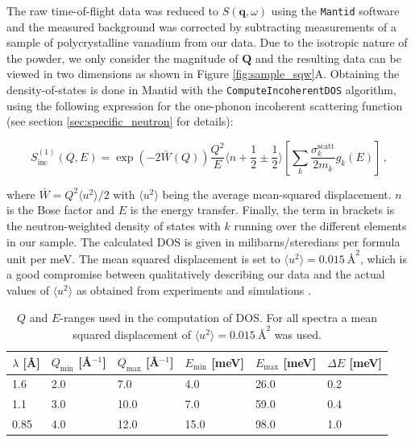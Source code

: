 The raw time-of-flight data was reduced to $S(\bm{q},\omega)$ using the \texttt{Mantid} \cite{Arnold2014} software and the measured background was corrected by subtracting measurements of a sample of polycrystalline vanadium from our data. Due to the isotropic nature of the powder, we only consider the magnitude of $\bm{Q}$ and the resulting data can be viewed in two dimensions as shown in Figure \ref{fig:sample_sqw}A. Obtaining the density-of-states is done in Mantid with the \texttt{ComputeIncoherentDOS} \cite{mantid_dos} algorithm, using the following expression for the one-phonon incoherent scattering function (see section \ref{sec:specific_neutron} for details):

 \[ S^{(1)}_{\mathrm{inc}}(Q,E) = \exp\left(-2\bar{W}(Q)\right) \frac{Q^2}{E} \langle n+\frac{1}{2}\pm\frac{1}{2} \rangle \left[ \sum_k \frac{\sigma_k^{\mathrm{scatt}}}{2m_k} g_k(E) \right]\, , \]
 
 \noindent where $\bar{W} = Q^2 \langle u^2 \rangle / 2$ with $\langle u^2 \rangle$ being the average mean-squared displacement. $n$ is the Bose factor and $E$ is the energy transfer. Finally, the term in brackets is the neutron-weighted density of states with $k$ running over the different elements in our sample. The calculated DOS is given in milibarns/steredians per formula unit per meV. The mean squared displacement is set to $\langle u^2 \rangle = \SI{0.015}{\angstrom\squared}$, which is a good compromise between qualitatively describing our data and the actual values of $\langle u^2 \rangle$ as obtained from experiments \cite{Hafliger2014} and simulations .
 
 \begin{table}
    \caption[IN4: $Q$ and $E$ windows for DOS integration]{$Q$ and $E$-ranges used in the computation of DOS. For all spectra a mean squared displacement of $\langle u^2 \rangle = \SI{0.015}{\angstrom\squared}$ was used.}
    \label{tab:qeranges}
    \centering
    \begin{tabular}{llllll}
    \toprule
    $\lambda$ [\AA] & $Q_\text{min}$ [\AA$^{-1}$] & $Q_\text{max}$ [\AA$^{-1}$] & $E_\text{min}$ [meV] & $E_\text{max}$ [meV] & $\Delta E$ [meV] \\ \midrule
    1.6             & 2.0                         & 7.0                         & 4.0                  & 26.0                 & 0.2              \\
    1.1             & 3.0                         & 10.0                        & 7.0                  & 59.0                 & 0.4              \\
    0.85            & 4.0                         & 12.0                        & 15.0                 & 98.0                 & 1.0              \\ \bottomrule
    \end{tabular}
 \end{table}


